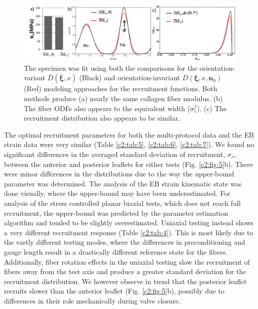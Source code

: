     
\begin{figure}
\centering
\includegraphics[width=\textwidth]{Images/chapter2/figure6.pdf}
\caption{The specimen was fit using both the comparisons for the orientation-variant $\bar{D}(\bar{\mathbf{\xi}},x)$ (Black) and orientation-invariant $D(\mathbf{\xi},x,\mathbf{n}_0)$ (Red) modeling approaches for the recruitment functions. Both methods produce (a) nearly the same collagen fiber modulus. (b) The fiber ODFs also appears to the equivalent width ($\sigma_c^f$). (c) The recruitment distribution also appears to be similar.}
\label{c2:fig:6}
\end{figure}
    
    
    The optimal recruitment parameters for both the multi-protocol data and the EB strain data were very similar (Table \ref{c2:tab:5}, \ref{c2:tab:6}, \ref{c2:tab:7}). We found no significant differences in the averaged standard deviation of recruitment, $\sigma_r$, between the anterior and posterior leaflets for either tests (Fig. \ref{c2:fig:5}b). There were minor differences in the distributions due to the way the upper-bound parameter was determined. The analysis of the EB strain kinematic state was done visually, where the upper-bound may have been underestimated. For analysis of the stress controlled planar biaxial tests, which does not reach full recruitment, the upper-bound was predicted by the parameter estimation algorithm and tended to be slightly overestimated. Uniaxial testing instead shows a very different recruitment response (Table \ref{c2:tab:4}). This is most likely due to the vastly different testing modes, where the differences in preconditioning and gauge length result in a drastically different reference state for the fibers. Additionally, fiber rotation effects in the uniaxial testing slow the recruitment of fibers away from the test axis and produce a greater standard deviation for the recruitment distribution. We however observe in trend that the posterior leaflet recruits slower than the anterior leaflet (Fig. \ref{c2:fig:5}b), possibly due to differences in their role mechanically during valve closure.
    
